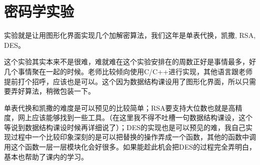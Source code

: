 \documentclass[UTF8]{ctexart}
\begin{document}
\newpage
\section{密码学实验}
\large{实验就是让用图形化界面实现几个加解密算法，我们这年是单表代换，凯撒, RSA, DES。

这个实验其实本来不是很难，难就难在这个实验安排在的周数正好是事情最多，好几个事情聚在一起的时候。老师比较倾向使用C/C++进行实现，其他语言跟老师提前打个招呼，应该也是可以。这个因为数据结构课设用了图形化界面，所以只需要弄好算法，稍微包装一下。

单表代换和凯撒的难度是可以预见的比较简单；RSA要支持大位数也就是高精度，网上应该能够找到一些工具。（在这里我不得不吐槽一句数据结构课设，这个等说到数据结构课设时候再详细说了）；DES的实现也是可以预见的难，我自己实现过程中一个比较印象深刻的是可以把替换的操作弄成一个函数，其他的函数中调用这个函数一层一层模块化会好很多。如果能趁此机会把DES的过程完全弄明白，基本也帮助了课内的学习。}

\newpage
\end{document}
